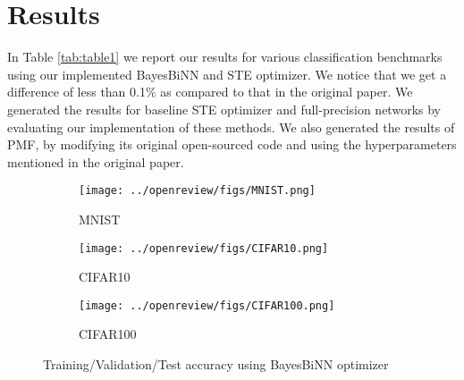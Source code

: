 \section{Results}
In Table \autoref{tab:table1} we report our results for various classification benchmarks using our implemented BayesBiNN and STE optimizer. We notice that we get a difference of less than 0.1\% as compared to that in the original paper. We generated the results for baseline STE optimizer and full-precision networks by evaluating our implementation of these methods. We also generated the results of PMF, by modifying its original open-sourced code and using the hyperparameters mentioned in the original paper.

\begin{figure}[h]
     \centering
     \begin{subfigure}[b]{0.3\textwidth}
         \centering
         \texttt{[image: ../openreview/figs/MNIST.png]}
         \caption{MNIST}
     \end{subfigure}
     \hfill
     \begin{subfigure}[b]{0.3\textwidth}
         \centering
         \texttt{[image: ../openreview/figs/CIFAR10.png]}
         \caption{CIFAR10}
     \end{subfigure}
     \hfill
     \begin{subfigure}[b]{0.3\textwidth}
         \centering
         \texttt{[image: ../openreview/figs/CIFAR100.png]}
         \caption{CIFAR100}
     \end{subfigure}
        \caption{Training/Validation/Test accuracy using BayesBiNN optimizer}
\end{figure}

